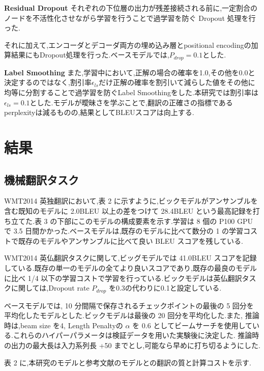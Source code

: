 \documentclass{jarticle}     %
\begin{document}
\textbf{Residual Dropout}
それぞれの下位層の出力が残差接続される前に,一定割合のノードを不活性化させながら学習を行うことで過学習を防ぐ Dropout 処理\cite{Dropout,27}を行った.\par
それに加えて,エンコーダとデコーダ両方の埋め込み層とpositional encodingの加算結果にもDropout処理を行った.ベースモデルでは,$P_{drop} = 0.1$とした.

\textbf{Label Smoothing}
また,学習中において,正解の場合の確率を1.0,その他を0.0と決定するのではなく,割引率$\epsilon_{ls}$だけ正解の確率を割引いて減らした値をその他に均等に分割することで過学習を防ぐLabel Smoothing\cite{LabelSmoothing}をした.本研究では割引率は$\epsilon_{ls} = 0.1$とした\cite{30}.モデルが曖昧さを学ぶことで,翻訳の正確さの指標であるperplexityは減るものの,結果としてBLEUスコアは向上する.

\section{結果}


\subsection{機械翻訳タスク}
WMT2014 英独翻訳において,表 2 に示すように,ビックモデルがアンサンブルを含む既知のモデルに 2.0BLEU 以上の差をつけて 28.4BLEU という最高記録を打ち立てた.表 3 の下部にこのモデルの構成要素を示す.学習は 8 個の P100 GPU で 3.5 日間かかった.ベースモデルは,既存のモデルに比べて数分の 1 の学習コストで既存のモデルやアンサンブルに比べて良い BLEU スコアを残している.
\par
 WMT2014 英仏翻訳タスクに関して,ビッグモデルでは 41.0BLEU スコアを記録している.既存の単一のモデルの全てより良いスコアであり,既存の最良のモデルに比べ 1/4 以下の学習コストで学習を行っている.ビックモデルは英仏翻訳タスクに関しては,Dropout rate $P_{drop}$ を0.3の代わりに0.1と設定している.
\par

ベースモデルでは, 10 分間隔で保存されるチェックポイントの最後の 5 回分を平均化したモデルとした.ビックモデルは最後の 20 回分を平均化した.また, 推論時は,beam size を4, Length Penaltyの $\alpha$ を 0.6 としてビームサーチを使用している\cite{31}.これらのハイパーパラメータは検証データを用いた実験後に決定した.
推論時の出力の最大長は入力系列長 +50 までとし,可能なら早めに打ち切るようにした\cite{31}.
\par
表 2 に,本研究のモデルと参考文献のモデルとの翻訳の質と計算コストを示す.
\end{document}
